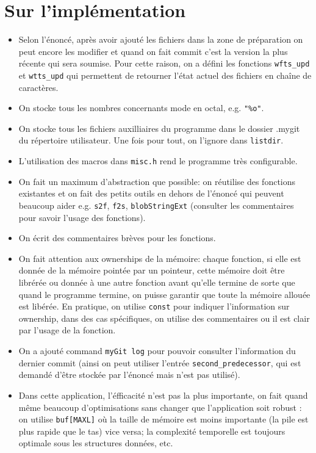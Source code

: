 \documentclass{report}
\begin{document}
\section*{Sur l'implémentation}
\begin{itemize}
  \item Selon l'énoncé, après avoir ajouté les fichiers dans la zone de préparation on peut encore les modifier et quand on
  fait commit c'est la version la plus récente qui sera soumise. Pour cette raison, on a défini les
  fonctions \verb|wfts_upd| et \verb|wtts_upd| qui permettent de retourner l'état actuel des fichiers en chaîne de caractères.
  \item On stocke tous les nombres concernants mode en octal, e.g. \verb|"%o"|.
  \item On stocke tous les fichiers auxilliaires du programme dans le dossier .mygit
  du répertoire utilisateur. Une fois pour tout, on l'ignore dans \verb|listdir|.
  \item L'utilisation des macros dans \verb|misc.h| rend le programme très configurable.
  \item On fait un maximum d'abstraction que possible: on réutilise des fonctions existantes et
  on fait des petits outils en dehors de l'énoncé qui peuvent beaucoup aider e.g. \verb|s2f|, \verb|f2s|, \verb|blobStringExt| (consulter les commentaires pour savoir l'usage des fonctions).
  \item On écrit des commentaires brèves pour les fonctions.
  \item On fait attention aux ownerships de la mémoire: chaque fonction, si elle est donnée de la mémoire pointée
  par un pointeur, cette mémoire doit être librérée ou donnée à une autre fonction avant qu'elle termine de sorte
  que quand le programme termine, on puisse garantir que toute la mémoire allouée est libérée. En pratique, on utilise
  \verb|const| pour indiquer l'information sur ownership, dans des cas spécifiques, on utilise des commentaires ou il est
  clair par l'usage de la fonction.
  \item On a ajouté command \verb|myGit log| pour pouvoir consulter l'information du dernier commit (ainsi on
  peut utiliser l'entrée \verb|second_predecessor|, qui est demandé d'être stockée par l'énoncé mais n'est pas utilisé).
  \item Dans cette application, l'éfficacité n'est pas la plus importante, on fait quand même beaucoup d'optimisations sans changer que
  l'application soit robust : on utilise \verb|buf[MAXL]| où la taille de mémoire est moins importante (la pile est plus rapide que le tas) vice versa; 
  la complexité temporelle est toujours optimale sous les structures données, etc.
\end{itemize}
\end{document}
